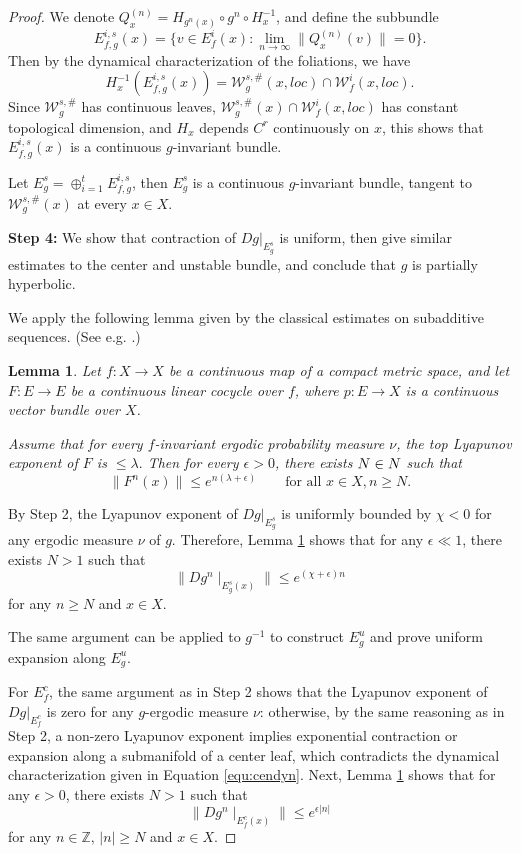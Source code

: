 \documentclass[11pt]{amsart}
\numberwithin{equation}{section}
\newcommand{\N}{\mathbb{N}}
\newcommand{\Z}{\mathbb{Z}}
\newcommand{\W}{\mathcal{W}}
\theoremstyle{plain}
\newtheorem{lem}[thm]{Lemma}
\begin{document}
\begin{proof}
We denote $Q^{(n)}_x=H_{g^n(x)}\circ g^n\circ H^{-1}_x$, and define the subbundle $$E^{i,s}_{f,g}(x)=\{v\in E^i_f(x): \lim_{n\to \infty} \|Q^{(n)}_x(v)\|=0\}.$$ Then by the dynamical characterization of the foliations, we have $$H_x^{-1}(E^{i,s}_{f,g}(x))=\W^{s,\#}_g(x,loc)\cap \W^i_f(x,loc).$$ 
Since $\W^{s,\#}_g$ has continuous leaves, $\W^{s,\#}_g(x)\cap \W^i_f(x,loc)$ has constant topological dimension, and $H_x$ depends $C^r$ continuously on $x$, this shows that $E^{i,s}_{f,g}(x)$ is a continuous $g$-invariant bundle. 

Let $E^s_g=\oplus_{i=1}^t E^{i,s}_{f,g}$, then $E^s_g$ is a continuous $g$-invariant bundle, tangent to $\W^{s,\#}_g(x)$ at every $x\in X$.

\textbf{Step 4:} We show that contraction of $Dg|_{E^s_g}$ is uniform, then give similar estimates to the center and unstable bundle, and conclude that $g$ is partially hyperbolic.

We apply the following lemma given by the classical estimates on subadditive sequences. (See e.g. \cite{SCHREIBER1998334}.)

\begin{lem}\label{lem:subadd}
    Let $f:X\to X$ be a continuous map of a compact metric space, and let
$F:E\to E$ be a continuous linear cocycle over $f$, where
$p:E\to X$ is a continuous vector bundle over $X$.

Assume that for \emph{every} $f$-invariant ergodic probability measure $\nu$,
the top Lyapunov exponent of $F$ is
$\le \lambda .$
Then for every $\epsilon>0$, there exists $N\in \mathbb \N$ such that
\[
\|F^n(x)\|\leq e^{n(\lambda+\epsilon)}
\qquad \text{for all } x\in X, n\ge N.
\]
\end{lem}

By Step 2, the Lyapunov exponent of $Dg|_{E^s_g}$ is uniformly bounded by $\chi<0$ for any ergodic measure $\nu$ of $g$. Therefore, Lemma \ref{lem:subadd} shows that for any $\epsilon \ll 1$, there exists $N > 1$ such that
$$\|Dg^n \mid_{E^{s}_g(x)}\|\le e^{(\chi+\epsilon) n}$$
for any $n \ge N$ and $x \in X$. 

The same argument can be applied to $g^{-1}$ to construct $E^u_g$ and prove uniform expansion along $E^u_g$.

For $E^c_f$, the same argument as in Step 2 shows that the Lyapunov exponent of $Dg|_{E^c_f}$ is zero for any $g$-ergodic measure $\nu$: otherwise, by the same reasoning as in Step 2, a non-zero Lyapunov exponent implies exponential contraction or expansion along a submanifold of a center leaf, which contradicts the dynamical characterization given in Equation \ref{equ:cendyn}. Next, Lemma \ref{lem:subadd} shows that for any $\epsilon>0$, there exists $N>1$ such that $$\|Dg^n \mid_{E^{c}_f(x)}\|\le e^{\epsilon |n|}$$
for any $n\in \Z,\,|n| \ge N$ and $x \in X$. 


\end{proof}
\end{document}
